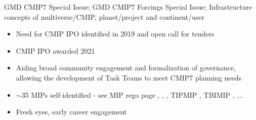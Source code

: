 \documentclass[gmd, preprint]{copernicus}
\def\cred#1{{\color{red}#1}}
\begin{document}
\cred{GMD CMIP7 Special Issue; GMD CMIP7 Forcings Special Issue; Infrastructure concepts of multiverse/CMIP, planet/project and continent/user}

\cred{
\begin{itemize}
	\item Need for CMIP IPO identified in 2019 and open call for tenders
	\item CMIP IPO awarded 2021
	\item Aiding broad community engagement and formalization of governance, allowing the development of Task Teams to meet CMIP7 planning needs
	\item $\sim$35 MIPs self-identified - see MIP rego page \citep[LESFMIP;][]{smith_attribution_2022}, \citep[RAMIP;][]{wilcox_regional_2023}, \citep[CERESMIP;][]{schmidt_ceresmip_2023}, TIPMIP \citep[][]{winkelmann_tipping_2023}, TBIMIP \citep[][]{richter_tropical_2024}, ...
    \item Fresh eyes, early career engagement
\end{itemize}
}








\appendix
\end{document}
